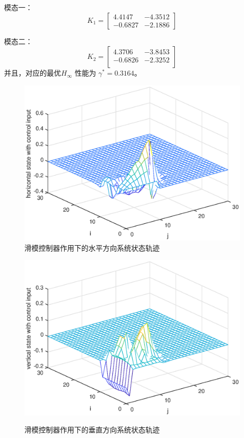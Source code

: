 	模态一：
	\begin{equation*}
	K_{1}=\begin{bmatrix}
	4.4147  & -4.3512\\
	-0.6827 &  -2.1886
	\end{bmatrix}
	\end{equation*}
	
	模态二：
	\begin{equation*}
	K_{2} = 	\begin{bmatrix}
	4.3706  & -3.8453 \\
	-0.6826 &  -2.3252 \\
	\end{bmatrix}
	\end{equation*}
	并且，对应的最优$H_{\infty}$ 性能为 $\gamma^{*}=0.3164$。
	\begin{figure}[!htb]
		\centering\includegraphics[scale=0.6]{./figures/2dsmc/simulations/h-state-with-force.eps}
		\caption{滑模控制器作用下的水平方向系统状态轨迹}
		\label{fig5}
	\end{figure}
	\begin{figure}[!htb]
		\centering\includegraphics[scale=0.6]{./figures/2dsmc/simulations/v-state-with-force_eps.eps}\\ 
		\caption{滑模控制器作用下的垂直方向系统状态轨迹}
		\label{fig6}
	\end{figure}

